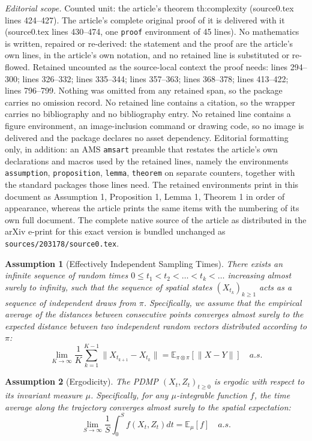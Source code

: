 \documentclass[10pt,a4paper]{amsart}
\newtheorem{assumption}{Assumption}
\begin{document}
\noindent\textit{Editorial scope.} Counted unit: the article's theorem th:complexity (source0.tex lines 424--427). The article's complete original proof of it is delivered with it (source0.tex lines 430--474, one \texttt{proof} environment of 45 lines). No mathematics is written, repaired or re-derived: the statement and the proof are the article's own lines, in the article's own notation, and no retained line is substituted or re-flowed.  Retained uncounted as the source-local context the proof needs: lines 294--300; lines 326--332; lines 335--344; lines 357--363; lines 368--378; lines 413--422; lines 796--799.  Nothing was omitted from any retained span, so the package carries no omission record.  No retained line contains a citation, so the wrapper carries no bibliography and no bibliography entry.  No retained line contains a figure environment, an image-inclusion command or drawing code, so no image is delivered and the package declares no asset dependency.  Editorial formatting only, in addition: an AMS \texttt{amsart} preamble that restates the article's own declarations and macros used by the retained lines, namely the environments \texttt{assumption}, \texttt{proposition}, \texttt{lemma}, \texttt{theorem} on separate counters, together with the standard packages those lines need.  The retained environments print in this document as Assumption 1, Proposition 1, Lemma 1, Theorem 1 in order of appearance, whereas the article prints the same items with the numbering of its own full document.  The complete native source of the article as distributed in the arXiv e-print for this exact version is bundled unchanged as \texttt{sources/203178/source0.tex}.
\begin{assumption}[Effectively Independent Sampling Times]
    \label{assum:independent_times}
    There exists an infinite sequence of random times $0 \leq t_1 < t_2 < \dots < t_k < \dots$ increasing almost surely to infinity, such that the sequence of spatial states $(X_{t_k})_{k \geq 1}$ acts as a sequence of independent draws from $\pi$. Specifically, we assume that the empirical average of the distances between consecutive points converges almost surely to the expected distance between two independent random vectors distributed according to $\pi$:
    \[
        \lim_{K \to \infty} \frac{1}{K} \sum_{k=1}^{K-1} \|X_{t_{k+1}} - X_{t_k}\| = \mathbb{E}_{\pi \otimes \pi}[\|X - Y\|] \quad a.s.
    \]
\end{assumption}

\begin{assumption}[Ergodicity]
    \label{assum:ergodicity}
    The PDMP $(X_t, Z_t)_{t \geq 0}$ is ergodic with respect to its invariant measure $\mu$. Specifically, for any $\mu$-integrable function $f$, the time average along the trajectory converges almost surely to the spatial expectation:
    \[
        \lim_{S \to \infty} \frac{1}{S} \int_0^S f(X_t, Z_t) dt = \mathbb{E}_\mu[f] \quad a.s.
    \]
\end{assumption}
\end{document}
